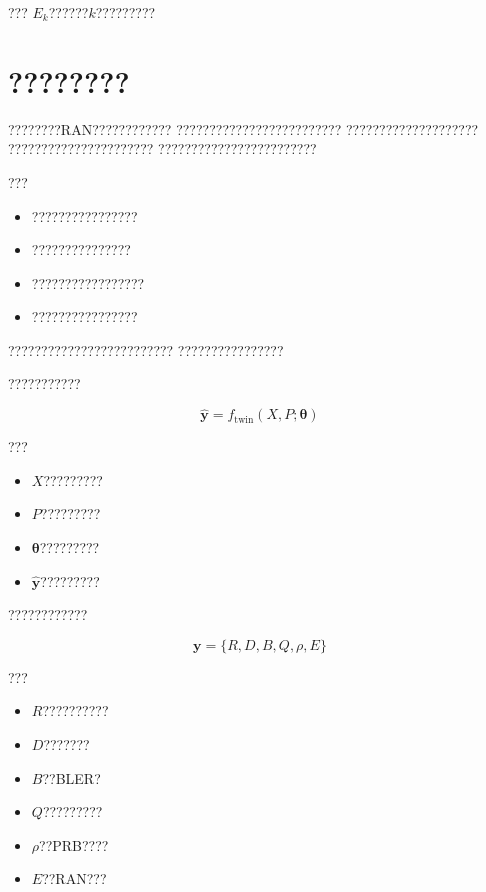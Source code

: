 ???
$E_k$??????$k$?????????

\section{????????}
\label{sec:twin_model_calibration}

????????RAN????????????
?????????????????????????
????????????????????
??????????????????????
????????????????????????

???

\begin{itemize}
    \item ????????????????
    \item ???????????????
    \item ?????????????????
    \item ????????????????
\end{itemize}

?????????????????????????
????????????????


???????????

\begin{equation}
\hat{\boldsymbol{y}}
=
f_{\mathrm{twin}}
(
X,
P;
\boldsymbol{\theta}
)
\end{equation}

???

\begin{itemize}
    \item $X$?????????
    \item $P$?????????
    \item $\boldsymbol{\theta}$?????????
    \item $\hat{\boldsymbol{y}}$?????????
\end{itemize}


????????????

\begin{equation}
\boldsymbol{y}
=
\{
R,
D,
B,
Q,
\rho,
E
\}
\end{equation}

???

\begin{itemize}
    \item $R$??????????
    \item $D$???????
    \item $B$??BLER?
    \item $Q$?????????
    \item $\rho$??PRB????
    \item $E$??RAN???
\end{itemize}


